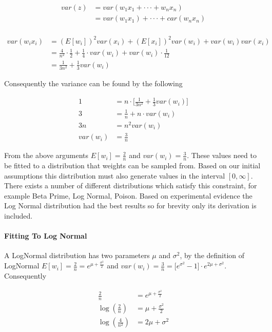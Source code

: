 \begin{align*}
var(z) &= var(w_1x_1 + \cdot \cdot \cdot + w_nx_n)\\
&= var(w_1x_1) + \cdot \cdot \cdot + car(w_nx_n)\\
\end{align*}

\begin{align*}
var(w_ix_i) &= (E[w_i])^2var(x_i) + (E[x_i])^2var(w_i) + var(w_i)var(x_i)\\
&= \frac{4}{n^2} \cdot \frac{1}{2} + \frac{1}{4} \cdot var(w_i) + var(w_i) \cdot \frac{1}{12}\\
&= \frac{1}{3 n^2} + \frac{1}{3}var(w_i)
\end{align*}

Consequently the variance can be found by the following

\begin{align*}
1 &= n \cdot \big[\frac{1}{3 n^2} + \frac{1}{3}var(w_i)\big]\\
3 &= \frac{1}{n} + n \cdot var(w_i)\\
3n &= n^2 var(w_i)\\
var(w_i) &= \frac{3}{n}
\end{align*}

From the above arguments $E[w_i] = \frac{2}{n}$ and $var(w_i) = \frac{3}{n}$. These values need to be fitted to a distribution that weights can be sampled from. Based on our initial assumptions this distribution must also generate values in the interval $[0, \infty]$. There exists a number of different distributions which satisfy this constraint, for example Beta Prime, Log Normal, Poison. Based on experimental evidence the Log Normal distribution had the best results so for brevity only its derivation is included.

\paragraph{Fitting To Log Normal}

A LogNormal distribution has two parameters $\mu$ and $\sigma^2$, by the definition of LogNormal $E[w_i] = \frac{2}{n} = e^{\mu + \frac{\sigma^2}{2}}$ and $var(w_i) = \frac{3}{n} = \big[e^{\sigma^2} - 1\big] \cdot e^{2\mu + \sigma^2}$. Consequently

\begin{align*}
\frac{2}{n} &= e^{\mu + \frac{\sigma^2}{2}}\\
\log(\frac{2}{n}) &= \mu + \frac{\sigma^2}{2}\\
\log(\frac{4}{n^2}) &= 2\mu + \sigma^2
\end{align*}

